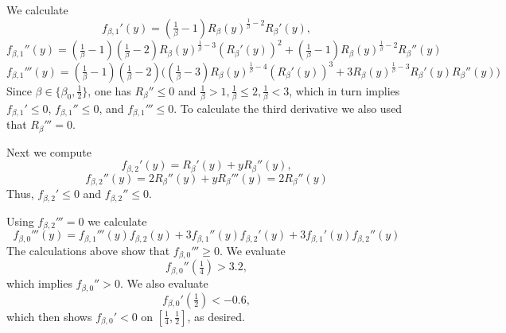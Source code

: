 \documentclass[12pt]{amsart}
\theoremstyle{plain}
\theoremstyle{definition}
\theoremstyle{remark}
\numberwithin{equation}{section}
\begin{document}
We   calculate 
\[f_{\beta,1}'(y) = (\tfrac{1}{\beta}-1)R_\beta(y)^{\frac{1}{\beta}-2}R_\beta'(y),\]
 \[f_{\beta,1}''(y) = (\tfrac{1}{\beta}-1)(\tfrac{1}{\beta}-2)R_\beta(y)^{\frac{1}{\beta}-3}(R_\beta'(y))^2+(\tfrac{1}{\beta}-1)R_\beta(y)^{\frac{1}{\beta}-2}R_\beta''(y)\]
 \[f_{\beta,1}'''(y) = (\tfrac{1}{\beta}-1)(\tfrac{1}{\beta}-2)\big((\tfrac{1}{\beta}-3)R_\beta(y)^{\frac{1}{\beta}-4}(R_\beta'(y))^3 + 3 R_\beta(y)^{\frac{1}{\beta}-3}R_\beta'(y)R_\beta''(y)\big)\]
Since $\beta\in \{\beta_0,\tfrac{1}{2}\}$, one has $R_\beta''\leq 0$ and $\tfrac{1}{\beta}>1,\tfrac{1}{\beta}\leq 2,\tfrac{1}{\beta}<3$, which in turn implies  $f_{\beta,1}'\leq 0$,   $f_{\beta,1}''\leq 0$,  and $f_{\beta,1}'''\leq  0$. To calculate the third derivative we also used that   $R_\beta'''=0$.

Next we compute
\[f_{\beta,2}'(y)=R_\beta'(y)+yR_\beta''(y),\]
\[f_{\beta,2}''(y) = 2R_\beta''(y) +yR_\beta'''(y) = 2R_\beta''(y) \]
Thus,   $f_{\beta,2}'\leq  0$ and $f_{\beta,2}''\leq  0$. 

Using $f_{\beta,2}'''=0$ we calculate
\[f_{\beta,0}'''(y) = f_{\beta,1}'''(y)f_{\beta,2}(y) + 3f_{\beta,1}''(y)f_{\beta,2}'(y) + 3f_{\beta,1}'(y)f_{\beta,2}''(y)\]
The calculations above show that $f_{\beta,0}'''\geq 0$. We evaluate 
\begin{equation}
f_{\beta,0}''(\tfrac{1}{4}) >  3.2,
\end{equation}   which implies $f_{\beta,0}''>0$. We also evaluate 
\begin{equation}
f_{\beta,0}'(\tfrac{1}{2})< -0.6, 
\end{equation}
 which then shows $f_{\beta,0}'<0$ on $[\tfrac{1}{4},\tfrac{1}{2}]$,  as desired.
 
\end{document}

